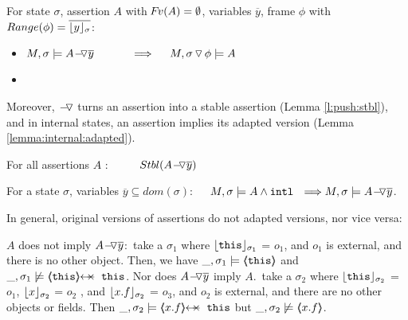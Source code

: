 \begin{lemma} 
\label{lemma:push:ass:state}
For   state  $\sigma$, assertion $A$ with $\fv(A)=\emptyset$,  variables   $\overline y$, frame $\phi$ with $Range (\phi)=\overline {\interpret \sigma y}$:


\begin{itemize} %
 \item
 \label{lemma:push:ass:state:one}
$M, \sigma \models \PushAS  {y} {A}\ \  \ \ \ \ \  \ \ \    \Longrightarrow  \ \ \ \ M,  \PushSLong {\phi} {\sigma}   \models A$
\item
 \label{lemma:push:ass:state:two}
\end{itemize}  %
\end{lemma}


Moreover, $\FIXSymbolA$ turns an assertion into a stable assertion (Lemma \ref{l:push:stbl}), and {in internal states, an assertion implies its adapted version (Lemma \ref{lemma:internal:adapted}).}

\begin{lemma}
For all    assertions $A$ : \ \ \ \ \  $\Stable{ \PushAS y A}$
\label{l:push:stbl}
\end{lemma}

{
\begin{lemma}
\label{lemma:internal:adapted}
For a state $\sigma$, variables $\overline y\subseteq dom(\sigma)$:\ \ \ $M, \sigma \models A \wedge \intThis \ \ \Longrightarrow M, \sigma \models  \PushAS {y} {A}$.
\end{lemma}
}

{ In general, original versions of  assertions do  not   adapted versions, nor vice versa:}
 

\begin{example}
\label{push:does:not:imply}
\notesep   $A$ does not imply $\PushAS {y} {A}$:\  \Eg  take 
  a   $\sigma_1$ where $\interpret {\sigma_1} {\prg{this}}$ = $o_1$, and $o_1$ is {external},  and there is no other object. Then, we have
$\_,\sigma_1 \models \inside {\prg{this}}$ and $\_,\sigma_1 \not\models \protectedFrom {\prg{this}} {\prg{this}}$.
\notesep Nor does  $\PushAS {y} {A}$  imply $A$.\  \Eg  take a $\sigma_2$ where $\interpret {\sigma_2} {\prg{this}}$ = $o_1$,
 $\interpret {\sigma_2} {x}$ = $o_2$ , and  $\interpret {\sigma_2} {x.f}$ = $o_3$, and $o_2$ is external, and there are no other objects or fields.
 Then $\_,\sigma_2 \models   \protectedFrom {x.f} {\prg{this}}$ but  $\_,\sigma_2 \not\models \inside {x.f}$.
\end{example}






